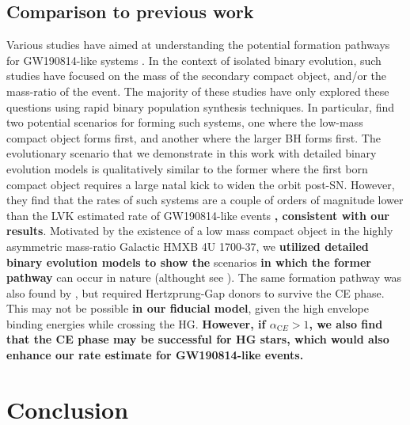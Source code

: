 \documentclass[linenumbers,trackchanges,twocolumn]{aastex701}
\begin{document}
\subsection{Comparison to previous work}

Various studies have aimed at understanding the potential formation
pathways for GW190814-like systems \citep[e.g.,][]{2020ApJ...899L...1Z, 2021MNRAS.500.1380M, 2021ApJ...908L..38A, 2021MNRAS.500.1817L, 2025arXiv251116648M}. In the context of
isolated binary evolution, such studies have focused on the mass of
the secondary compact object, and/or the mass-ratio of the event. The
majority of these studies have only explored these questions using rapid
binary population synthesis techniques. In particular,
\cite{2020ApJ...899L...1Z} find two potential scenarios for forming
such systems, one where the low-mass compact object
forms first, and another where the larger BH forms first. The
evolutionary scenario that we demonstrate in this work with detailed binary evolution models is qualitatively
similar to the former where the first born compact object requires a large natal kick to widen the orbit post-SN. However, they find that the rates of such systems are a couple of orders of magnitude lower than the LVK estimated rate of GW190814-like events \textbf{, consistent with our results}. Motivated by the existence of a low mass compact object in the highly asymmetric mass-ratio Galactic HMXB 4U 1700-37, we \textbf{utilized detailed binary evolution models to show the} scenarios \textbf{in which the former pathway} can occur in nature (althought see \citealp{2025ApJ...989..188X}). The same formation pathway was also found by \cite{2021MNRAS.500.1380M}, but required Hertzprung-Gap donors to survive the CE phase. This may not be possible \textbf{in our fiducial model}, given the high envelope binding energies while crossing the HG. \textbf{However, if $\alpha_{\mathrm CE} > 1$, we also find that the CE phase may be successful for HG stars, which would also enhance our rate estimate for GW190814-like events.} 

\section{Conclusion} \label{sec:conclusion}
\end{document}
